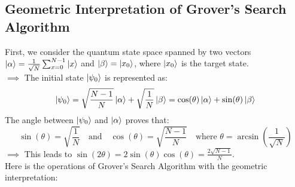 \documentclass{book}
\begin{document}
\subsection{Geometric Interpretation of Grover's Search Algorithm}
First, we consider the quantum state space spanned by two vectors $\ket{\alpha} = \frac{1}{\sqrt{N}} \sum_{x=0}^{N-1} \ket{x}$ and $\ket{\beta} = \ket{x_0}$, where $\ket{x_0}$ is the target state.\\
$\implies$ The initial state $\ket{\psi_0}$ is represented as:
\begin{align*}
    \ket{\psi_0} = \sqrt{\frac{N - 1}{N}} \ket{\alpha} + \sqrt{\frac{1}{N}} \ket{\beta} = \cos(\theta)\ket{\alpha} + \sin(\theta)\ket{\beta}
\end{align*}
The angle between $\ket{\psi_0}$ and $\ket{\alpha}$ proves that:
\[
    \sin (\theta) = \sqrt{\frac{1}{N}} \quad \text{and} \quad \cos(\theta) = \sqrt{\frac{N - 1}{N}} \quad \text{where } \theta = \arcsin\left(\frac{1}{\sqrt{N}}\right)
\]
$\implies$ This leads to $\sin(2\theta) = 2\sin(\theta)\cos(\theta) = \frac{2\sqrt{N - 1}}{N}$.\\
\vspace{2mm}
Here is the operations of Grover's Search Algorithm with the geometric interpretation:
\end{document}
